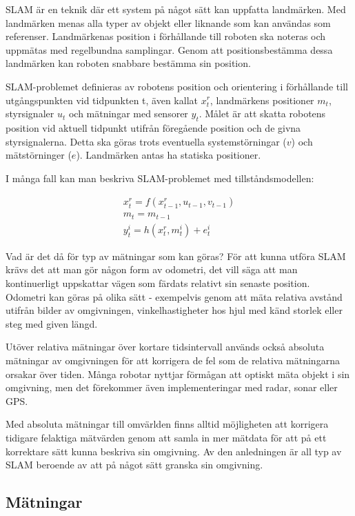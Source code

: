 \documentclass[a4paper,12pt,fleqn]{article}
\begin{document}
SLAM är en teknik där ett system på något sätt kan uppfatta landmärken. Med landmärken menas alla typer av objekt eller liknande som kan användas som referenser. Landmärkenas position i förhållande till roboten ska noteras och uppmätas med regelbundna samplingar. Genom att positionsbestämma dessa landmärken kan roboten snabbare bestämma sin position. 

SLAM-problemet definieras av robotens position och orientering i förhållande till utgångspunkten vid tidpunkten t, även kallat $x_{t}^r$, landmärkens positioner $m_t$, styrsignaler $u_{t}$ och mätningar med sensorer $y_{t}$. Målet är att skatta robotens position vid aktuell tidpunkt utifrån föregående position och de givna styrsignalerna. Detta ska göras trots eventuella systemstörningar ($v$) och mätstörninger ($e$). Landmärken antas ha statiska positioner. 

I många fall kan man beskriva SLAM-problemet med tillståndsmodellen:

\begin{gather}
x_{t}^r = f(x_{t-1}^r, u_{t-1}, v_{t-1}) \\
m_{t} = m_{t-1} \\
y_{t}^i = h(x_{t}^r,m_{t}^i) + e_{t}^i
\end{gather}

%
Vad är det då för typ av mätningar som kan göras? För att kunna utföra SLAM krävs det att man gör någon form av odometri, det vill säga att man kontinuerligt uppskattar vägen som färdats relativt sin senaste position. Odometri kan göras på olika sätt - exempelvis genom att mäta relativa avstånd utifrån bilder av omgivningen, vinkelhastigheter hos hjul med känd storlek eller steg med given längd. 

Utöver relativa mätningar över kortare tidsintervall används också absoluta mätningar av omgivningen för att korrigera de fel som de relativa mätningarna orsakar över tiden. Många robotar nyttjar förmågan att optiskt mäta objekt i sin omgivning, men det förekommer även implementeringar med radar, sonar eller GPS. 

Med absoluta mätningar till omvärlden finns alltid möjligheten att korrigera tidigare felaktiga mätvärden genom att samla in mer mätdata för att på ett korrektare sätt kunna beskriva sin omgivning. Av den anledningen är all typ av SLAM beroende av att på något sätt granska sin omgivning. 

\subsection{Mätningar}
\end{document}
